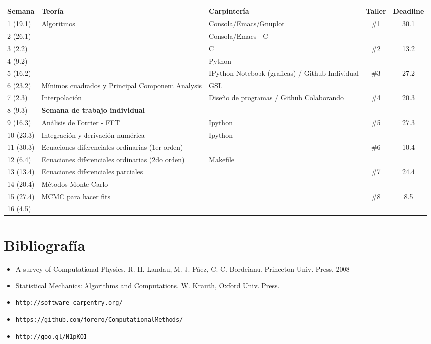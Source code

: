\documentclass[11pt]{article}
\begin{document}
\begin{center}
\begin{tabular}{|p{1.8cm}|p{6cm}|p{5cm}|c|c|}
\hline
Semana & Teor\'ia & Carpinter\'ia & Taller & Deadline \\\hline
1 (19.1) & Algoritmos	&Consola/Emacs/Gnuplot & \#1 & 30.1\\\hline
2 (26.1)& 	& Consola/Emacs - C  & &\\\hline
3 (2.2)& 	&C  & \#2   & 13.2\\\hline
4 (9.2)& 	&Python &  &\\\hline
5 (16.2)& 	&IPython Notebook (graficas) / Github Individual & \#3 & 27.2\\\hline
6 (23.2)&      M\'inimos cuadrados y Principal Component Analysis & GSL & &\\\hline
7 (2.3)&  Interpolaci\'on & Dise\~no de programas / Github Colaborando & \#4 & 20.3\\ \hline
8 (9.3)& {\bf Semana de trabajo individual} & & &\\\hline
9 (16.3)& An\'alisis de Fourier - FFT &  Ipython & \#5 & 27.3\\\hline
10 (23.3) & Integraci\'on y derivaci\'on num\'erica & Ipython & &\\\hline
11 (30.3) & Ecuaciones diferenciales ordinarias (1er orden)& &\#6 & 10.4\\\hline
12 (6.4) & Ecuaciones diferenciales ordinarias (2do orden)&  Makefile &  & \\\hline
13 (13.4) & Ecuaciones diferenciales parciales &  & \#7 & 24.4\\\hline
14 (20.4) & M\'etodos Monte Carlo &   &   & \\\hline
15 (27.4) & MCMC para hacer fits &    & \#8 & 8.5\\\hline
16 (4.5) &  &    &  & \\\hline

\hline
\end{tabular}
\end{center}


\section*{Bibliograf\'ia}
\begin{itemize}
\item
A survey of Computational Physics. R. H. Landau, M. J. P\'aez, C. C.
Bordeianu. Princeton Univ. Press. 2008 
\item
Statistical Mechanics: Algorithms and Computations. W. Krauth, Oxford Univ. Press. 
\item\verb"http://software-carpentry.org/"
\item\verb"https://github.com/forero/ComputationalMethods/"
\item\verb"http://goo.gl/N1pKOI"
\end{itemize}

 
\end{document}
